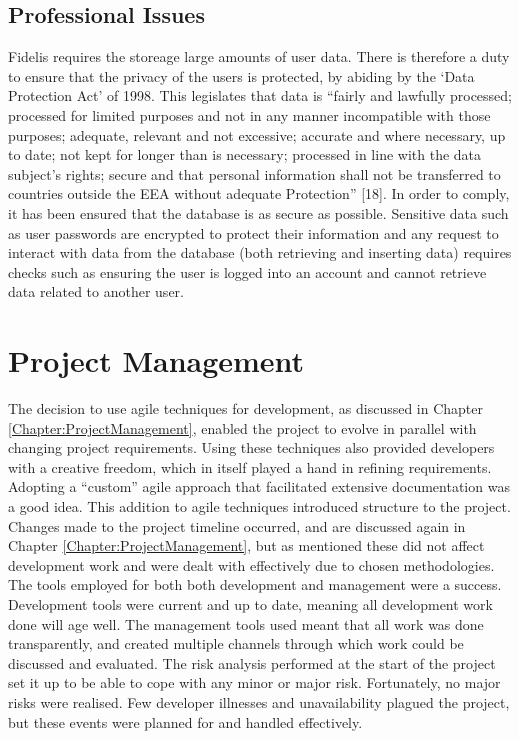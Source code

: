 \subsection{Professional Issues}
Fidelis requires the storeage large amounts of user data. There is therefore a duty to ensure that the privacy of the users is protected, by abiding by the `Data Protection Act' of 1998. This legislates that data is ``fairly and lawfully processed; processed for limited purposes and not in any manner incompatible with those purposes; adequate, relevant and not excessive; accurate and where necessary, up to date; not kept for longer than is necessary; processed in line with the data subject's rights; secure and that personal information shall not be transferred to countries outside the EEA without adequate Protection'' [18]. In order to comply, it has been ensured that the database is as secure as possible. Sensitive data such as user passwords are encrypted to protect their information and any request to interact with data from the database (both retrieving and inserting data) requires checks such as ensuring the user is logged into an account and cannot retrieve data related to another user.

\section{Project Management}
The decision to use agile techniques for development, as discussed in Chapter \ref{Chapter:ProjectManagement}, enabled the project to evolve in parallel with changing project requirements. Using these techniques also provided developers with a creative freedom, which in itself played a hand in refining requirements. Adopting a ``custom'' agile approach that facilitated extensive documentation was a good idea. This addition to agile techniques introduced structure to the project. Changes made to the project timeline occurred, and are discussed again in Chapter \ref{Chapter:ProjectManagement}, but as mentioned these did not affect development work and were dealt with effectively due to chosen methodologies. The tools employed for both both development and management were a success. Development tools were current and up to date, meaning all development work done will age well. The management tools used meant that all work was done transparently, and created multiple channels through which work could be discussed and evaluated. The risk analysis performed at the start of the project set it up to be able to cope with any minor or major risk. Fortunately, no major risks were realised. Few developer illnesses and unavailability plagued the project, but these events were planned for and handled effectively.